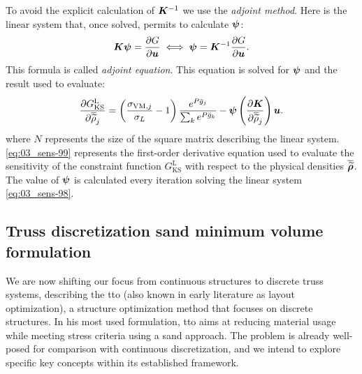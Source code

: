 To avoid the explicit calculation of $\bm{K}^{-1}$ we use the \textit{adjoint method}. Here is the linear system that, once solved, permits to calculate $\bm{\psi}$:
\begin{equation} \label{eq:03_sens-98}
    \bm{K}\bm{\psi} = \frac{\partial G}{\partial\bm{u}} \iff \bm{\psi} = \bm{K}^{-1}\frac{\partial G}{\partial\bm{u}}.
\end{equation}
This formula is called \textit{adjoint equation}. This equation is solved for $\bm{\psi}$ and the result used to evaluate:
\begin{equation}\label{eq:03_sens-99}
\frac{\partial G_{\text{KS}}^\text{L}}{\partial\overline{\widetilde{\rho}}_j} = \left(\frac{ \sigma_{\text{VM},j}}{\sigma_L}-1 \right) \frac{e^{{P}\bar{g}_j}}{\sum_k e^{{P}\bar{g}_k}} - \bm{\psi} \left(\frac{\partial\bm{K}}{\partial\overline{\widetilde{\rho}}_{j}}\right) \bm{u}.
\end{equation}
 where $N$ represents the size of the square matrix describing the linear system.
\eqref{eq:03_sens-99} represents the first-order derivative equation used to evaluate the sensitivity of the constraint function $G_{\text{KS}}^\text{L}$ with respect to the physical densities $\bm{\overline{\widetilde{\rho}}}$. The value of $\bm{\psi}$ is calculated every iteration solving the linear system \ref{eq:03_sens-98}.

\subsection{Truss discretization \gls{sand} minimum volume formulation}
We are now shifting our focus from continuous structures to discrete truss systems, describing the \acrfull{tto} (also known in early literature as layout optimization), a structure optimization method that focuses on discrete structures. In his most used formulation, \gls{tto} aims at reducing material usage while meeting stress criteria using a \gls{sand} approach. The problem is already well-posed for comparison with continuous discretization, and we intend to explore specific key concepts within its established framework.
